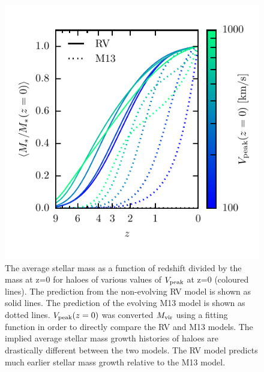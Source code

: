\documentclass[a4paper,fleqn,usenatbib]{mnras}
\begin{document}
\begin{figure}
    \includegraphics{figures/mstar_of_z_rm.pdf}
    \caption{The average stellar mass as a function of redshift divided by the mass at z=0 for haloes of various values of $V_{\rm peak}$ at z=0 (coloured lines).  The prediction from the non-evolving RV model is shown as solid lines.  The prediction of the evolving M13 model is shown as dotted lines.  $V_{\rm peak}(z=0)$ was converted $M_{\rm vir}$ using a fitting function in order to directly compare the RV and M13 models.  The implied average stellar mass growth histories of haloes are drastically different between the two models.  The RV model predicts {\rm much} earlier stellar mass growth relative to the M13 model.}
    \label{fig:mstar_of_z_rm}
\end{figure}
\end{document}
